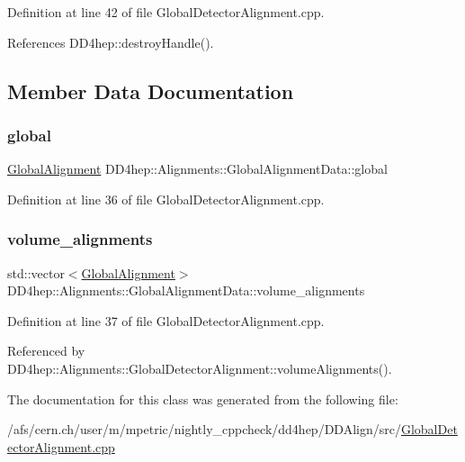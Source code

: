 Definition at line 42 of file Global\+Detector\+Alignment.\+cpp.



References D\+D4hep\+::destroy\+Handle().



\subsection{Member Data Documentation}
\hypertarget{class_d_d4hep_1_1_alignments_1_1_global_alignment_data_a353b81eec4fa99a0ed451a513a2dcc54}{}\label{class_d_d4hep_1_1_alignments_1_1_global_alignment_data_a353b81eec4fa99a0ed451a513a2dcc54} 
\subsubsection{\texorpdfstring{global}{global}}
{\footnotesize\ttfamily \hyperlink{class_d_d4hep_1_1_alignments_1_1_global_alignment}{Global\+Alignment} D\+D4hep\+::\+Alignments\+::\+Global\+Alignment\+Data\+::global}



Definition at line 36 of file Global\+Detector\+Alignment.\+cpp.

\hypertarget{class_d_d4hep_1_1_alignments_1_1_global_alignment_data_aaebd00327713124764b580f33523cdd5}{}\label{class_d_d4hep_1_1_alignments_1_1_global_alignment_data_aaebd00327713124764b580f33523cdd5} 
\subsubsection{\texorpdfstring{volume\+\_\+alignments}{volume\_alignments}}
{\footnotesize\ttfamily std\+::vector$<$\hyperlink{class_d_d4hep_1_1_alignments_1_1_global_alignment}{Global\+Alignment}$>$ D\+D4hep\+::\+Alignments\+::\+Global\+Alignment\+Data\+::volume\+\_\+alignments}



Definition at line 37 of file Global\+Detector\+Alignment.\+cpp.



Referenced by D\+D4hep\+::\+Alignments\+::\+Global\+Detector\+Alignment\+::volume\+Alignments().



The documentation for this class was generated from the following file\+:\begin{DoxyCompactItemize}
\item 
/afs/cern.\+ch/user/m/mpetric/nightly\+\_\+cppcheck/dd4hep/\+D\+D\+Align/src/\hyperlink{_global_detector_alignment_8cpp}{Global\+Detector\+Alignment.\+cpp}\end{DoxyCompactItemize}
